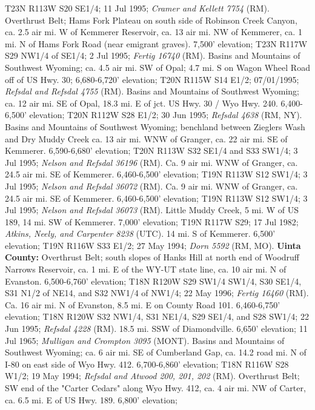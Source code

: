 T23N R113W S20 SE1/4; 11 Jul 1995; \textit{Cramer and Kellett 7754} (RM).
Overthrust Belt; Hams Fork Plateau on south side of Robinson Creek Canyon, ca.
2.5 air mi. W of Kemmerer Reservoir, ca. 13 air mi. NW of Kemmerer, ca. 1 mi. N
of Hams Fork Road (near emigrant graves). 7,500' elevation;
T23N R117W S29 NW1/4 of SE1/4; 2 Jul 1995; \textit{Fertig 16740} (RM).
Basins and Mountains of Southwest Wyoming; ca. 4.5 air mi. SW of Opal; 4.7 mi. S
on Wagon Wheel Road off of US Hwy. 30; 6,680-6,720' elevation;
T20N R115W S14 E1/2; 07/01/1995; \textit{Refsdal and Refsdal 4755} (RM).
Basins and Mountains of Southwest Wyoming; ca. 12 air mi. SE of Opal, 18.3 mi. E
of jct. US Hwy. 30 / Wyo Hwy. 240. 6,400-6,500' elevation; T20N R112W S28 E1/2;
30 Jun 1995; \textit{Refsdal 4638} (RM, NY).
Basins and Mountains of Southwest Wyoming; benchland between Zieglers Wash and
Dry Muddy Creek ca. 13 air mi. WNW of Granger, ca. 22 air mi. SE of Kemmerer.
6,590-6,680' elevation; T20N R113W S32 SE1/4 and S33 SW1/4; 3 Jul 1995;
\textit{Nelson and Refsdal 36196} (RM).
Ca. 9 air mi. WNW of Granger, ca. 24.5 air mi. SE of Kemmerer.
6,460-6,500' elevation; T19N R113W S12 SW1/4; 3 Jul 1995;
\textit{Nelson and Refsdal 36072} (RM).
Ca. 9 air mi. WNW of Granger, ca. 24.5 air mi. SE of Kemmerer.
6,460-6,500' elevation; T19N R113W S12 SW1/4; 3 Jul 1995;
\textit{Nelson and Refsdal 36073} (RM).
Little Muddy Creek, 5 mi. W of US 189, 14 mi. SW of Kemmerer. 7,000' elevation;
T19N R117W S29; 17 Jul 1982; \textit{Atkins, Neely, and Carpenter 8238} (UTC).
14 mi. S of Kemmerer. 6,500' elevation; T19N R116W S33 E1/2; 27 May 1994;
\textit{Dorn 5592} (RM, MO).
  \textbf{Uinta County:}
Overthrust Belt; south slopes of Hanks Hill at north end of Woodruff Narrows
Reservoir, ca. 1 mi. E of the WY-UT state line, ca. 10 air mi. N of Evanston.
6,500-6,760' elevation; T18N R120W S29 SW1/4 SW1/4, S30 SE1/4, S31 N1/2 of NE14,
and S32 NW1/4 of NW1/4; 22 May 1996; \textit{Fertig 16460} (RM).
Ca. 16 air mi. N of Evanston, 8.5 mi. E on County Road 101.
6,460-6,750' elevation; T18N R120W S32 NW1/4, S31 NE1/4, S29 SE1/4, and
S28 SW1/4; 22 Jun 1995; \textit{Refsdal 4228} (RM).
18.5 mi. SSW of Diamondville. 6,650’ elevation; 11 Jul 1965;
\textit{Mulligan and Crompton 3095} (MONT).
Basins and Mountains of Southwest Wyoming; ca. 6 air mi. SE of Cumberland Gap,
ca. 14.2 road mi. N of I-80 on east side of Wyo Hwy. 412.
6,700-6,860' elevation; T18N R116W S28 W1/2; 19 May 1994;
\textit{Refsdal and Atwood 200, 201, 202} (RM).
Overthrust Belt; SW end of the "Carter Cedars" along Wyo Hwy. 412,
ca. 4 air mi. NW of Carter, ca. 6.5 mi. E of US Hwy. 189. 6,800' elevation;
